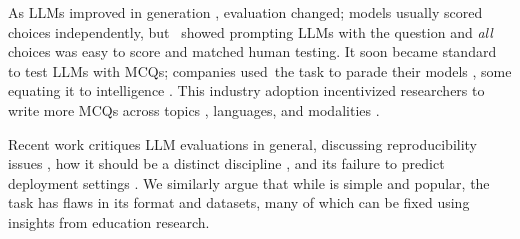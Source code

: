 As LLMs improved in generation \cite{brown2020language}, \mcqa evaluation changed;
models usually scored \mcqa choices independently, but~\citet{robinson2023leveraging} showed prompting LLMs with the question and \textit{all} choices was easy to score and matched human testing.
It soon became standard to test LLMs with MCQs; companies used~the task to parade their models \cite{achiam2023gpt}, some equating it to intelligence \cite{anthropic2024introducing}.
This industry adoption incentivized researchers to write more MCQs across topics \cite{rein2023gpqa}, languages, and modalities \cite{zhang2023m3exam}.


Recent work critiques LLM evaluations in general, discussing reproducibility issues \cite{laskar-etal-2024-systematic}, how it should be a distinct discipline \cite{chang2024survey}, and its failure to predict deployment settings \cite{saxon2024benchmarks}.
%
We similarly argue that while \mcqa is simple and popular, the task has flaws in its format and datasets, many of which can be fixed using insights from education research.

